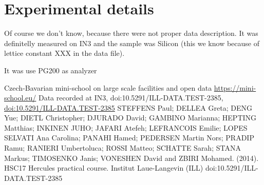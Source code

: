 \documentclass[%
 reprint,
 amsmath,amssymb,
 aps,
]{revtex4-2}
\begin{document}
\section{Experimental details}

Of course we don't know, because there were not proper data description.
It was definitelly measured on IN3 and the sample was Silicon (this we know because of lettice constant XXX in the data file).

It was use PG200 as analyzer

\begin{thebibliography}{9}

 Czech-Bavarian mini-school on large scale facilities and open data \url{https://mini-school.eu/}
 Data recorded at IN3, doi:10.5291/ILL-DATA.TEST-2385, \url{doi:10.5291/ILL-DATA.TEST-2385}
STEFFENS Paul; DELLEA Greta; DENG Yue; DIETL Christopher; DJURADO David; GAMBINO Marianna; HEPTING Matthias; INKINEN JUHO; JAFARI Atefeh; LEFRANCOIS Emilie; LOPES SELVATI Ana Carolina; PANAHI Hamed; PEDERSEN Martin Nors; PRADIP Ramu; RANIERI Umbertoluca; ROSSI Matteo; SCHATTE Sarah; STANA Markus; TIMOSENKO Janis; VONESHEN David and ZBIRI Mohamed. (2014). HSC17 Hercules practical course. Institut Laue-Langevin (ILL) doi:10.5291/ILL-DATA.TEST-2385

\end{thebibliography}
\end{document}
